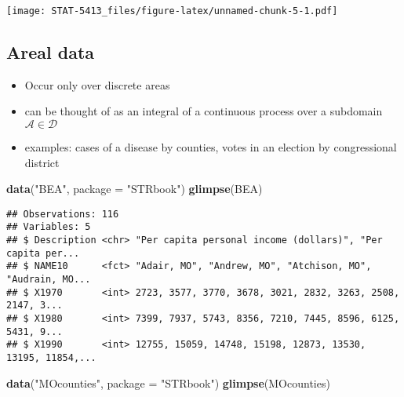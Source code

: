 \documentclass[]{book}
\newenvironment{Shaded}{\begin{snugshade}}{\end{snugshade}}
\newcommand{\DataTypeTok}[1]{\textcolor[rgb]{0.13,0.29,0.53}{#1}}
\newcommand{\KeywordTok}[1]{\textcolor[rgb]{0.13,0.29,0.53}{\textbf{#1}}}
\newcommand{\NormalTok}[1]{#1}
\newcommand{\StringTok}[1]{\textcolor[rgb]{0.31,0.60,0.02}{#1}}
\providecommand{\tightlist}{%
  \setlength{\itemsep}{0pt}\setlength{\parskip}{0pt}}
\begin{document}
\texttt{[image: STAT-5413\_files/figure-latex/unnamed-chunk-5-1.pdf]}

\hypertarget{areal-data}{%
\subsection{Areal data}\label{areal-data}}

\begin{itemize}
\tightlist
\item
  Occur only over discrete areas
\item
  can be thought of as an integral of a continuous process over a subdomain \(\mathcal{A} \in \mathcal{D}\)
\item
  examples: cases of a disease by counties, votes in an election by congressional district
\end{itemize}

\begin{Shaded}
\begin{Highlighting}[]
\KeywordTok{data}\NormalTok{(}\StringTok{"BEA"}\NormalTok{, }\DataTypeTok{package =} \StringTok{"STRbook"}\NormalTok{)}
\KeywordTok{glimpse}\NormalTok{(BEA)}
\end{Highlighting}
\end{Shaded}

\begin{verbatim}
## Observations: 116
## Variables: 5
## $ Description <chr> "Per capita personal income (dollars)", "Per capita per...
## $ NAME10      <fct> "Adair, MO", "Andrew, MO", "Atchison, MO", "Audrain, MO...
## $ X1970       <int> 2723, 3577, 3770, 3678, 3021, 2832, 3263, 2508, 2147, 3...
## $ X1980       <int> 7399, 7937, 5743, 8356, 7210, 7445, 8596, 6125, 5431, 9...
## $ X1990       <int> 12755, 15059, 14748, 15198, 12873, 13530, 13195, 11854,...
\end{verbatim}

\begin{Shaded}
\begin{Highlighting}[]
\KeywordTok{data}\NormalTok{(}\StringTok{"MOcounties"}\NormalTok{, }\DataTypeTok{package =} \StringTok{"STRbook"}\NormalTok{)}
\KeywordTok{glimpse}\NormalTok{(MOcounties)}
\end{Highlighting}
\end{Shaded}
\end{document}
